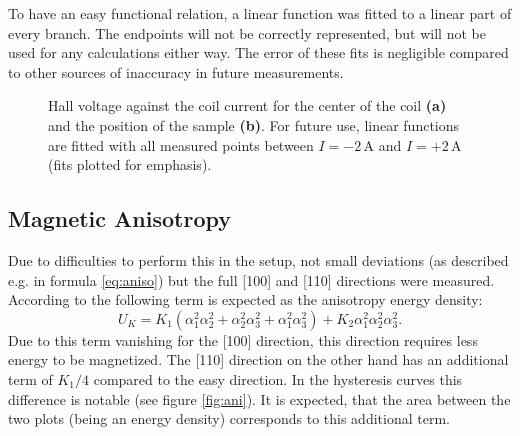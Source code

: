 \documentclass[a4paper]{scrartcl}
\numberwithin{equation}{section}
\numberwithin{figure}{section}
\numberwithin{table}{section}
\newcommand{\eq}[2]{\begin{equation}#1\label{#2}\end{equation}}
\begin{document}
To have an easy functional relation, a linear function was fitted to a linear part of every branch. The endpoints will not be correctly represented, but will not be used for any calculations either way. The error of these fits is negligible compared to other sources of inaccuracy in future measurements.
\begin{figure} 
 \centering
{}

\caption{
\small Hall voltage against the coil current for the center of the coil \textbf{(a)} and the position of the sample \textbf{(b)}. For future use, linear functions are fitted with all measured points between $I=-2\,\text{A}$ and $I=+2\,\text{A}$ (fits plotted for emphasis). } 
	\label{fig:cali}
\end{figure}


\subsection{Magnetic Anisotropy}
Due to difficulties to perform this in the setup, not small deviations (as described e.g. in formula \ref{eq:aniso}) but the full [100] and [110] directions were measured. According to \cite{kittel} the following term is expected as the anisotropy energy density:
\eq{U_K=K_1(\alpha_1^2\alpha_2^2 + \alpha_2^2\alpha_3^2 + \alpha_1^2\alpha_3^2) + K_2\alpha_1^2\alpha_2^2\alpha_3^2 .}{}
Due to this term vanishing for the [100] direction, this direction requires less energy to be magnetized. The [110] direction on the other hand has an additional term of $K_1 / 4$ compared to the easy direction. In the hysteresis curves this difference is notable (see figure \ref{fig:ani}). It is expected, that the area between the two plots (being an energy density) corresponds to this additional term.
\end{document}
